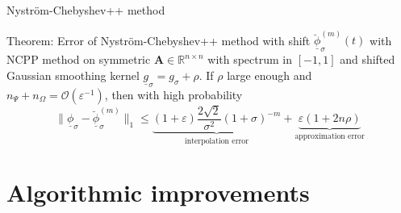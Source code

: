 \documentclass[aspectratio=169, leqno, 12pt]{beamer}
\newcommand{\mtx}[1]{\boldsymbol{#1}}
\begin{document}
\begin{frame}{Nystr\"om-Chebyshev++ method}
    \begin{block}{Theorem: Error of Nystr\"om-Chebyshev++ method with shift}
        $\underline{\breve{\phi}}_{\sigma}^{(m)}(t)$ with \gls{NCPP} method
        on symmetric $\mtx{A} \in \mathbb{R}^{n \times n}$ with spectrum in $[-1, 1]$
        and shifted Gaussian smoothing kernel $\underline{g}_{\sigma}=g_{\sigma} + \rho$.
        If $\rho$ large enough and $n_{\Psi} + n_{\Omega} = \mathcal{O}(\varepsilon^{-1})$,
        then with high probability
        \begin{equation}
            \lVert \underline{\phi}_{\sigma} - \breve{\underline{\phi}}_{\sigma}^{(m)} \rVert _1
            \leq \underbrace{(1 + \varepsilon) \frac{2\sqrt{2}}{\sigma^2} (1 + \sigma)^{-m}}_{\text{interpolation error}}
            + \underbrace{\varepsilon(1 + 2 n \rho)}_{\text{approximation error}}
        \end{equation}
    \end{block}
\end{frame}


\section{Algorithmic improvements}
\end{document}
